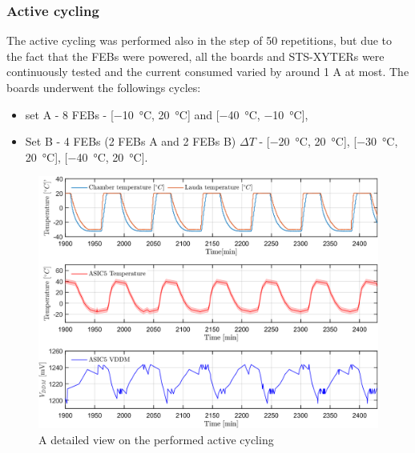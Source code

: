 \subsubsection{Active cycling}
The active cycling was performed also in the step of 50 repetitions, but due to the fact that the \glspl{FEB} were powered, all the boards and \gls{STS}-XYTERs were continuously tested and the current consumed varied by around 1 A at most. The boards underwent the followings cycles:
\begin{itemize}
    \item set A - 8 \glspl{FEB} - [\SI{-10}{\celsius}, \SI{20}{\celsius}] and [\SI{-40}{\celsius}, \SI{-10}{\celsius}],
    \item Set B - 4 \glspl{FEB} (2 \glspl{FEB} A and 2 \glspl{FEB} B)  $\Delta T$ - [\SI{-20}{\celsius}, \SI{20}{\celsius}], [\SI{-30}{\celsius}, \SI{20}{\celsius}], [\SI{-40}{\celsius}, \SI{20}{\celsius}].
\end{itemize}

\begin{figure}[!h]
\centering
\includegraphics[width=0.57\columnwidth]{Chapter3/Cycling/Images/FEB0ASIC5COMP.png}
\caption{A detailed view on the performed active cycling}
\label{fig_active_detailed}
\end{figure}


